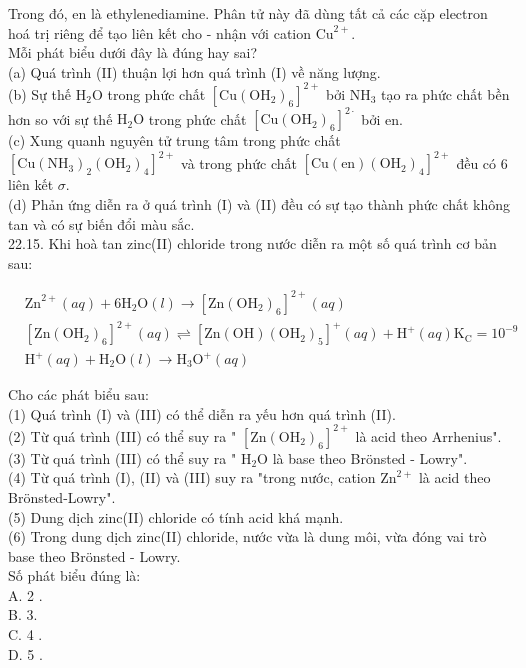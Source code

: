 \documentclass[10pt]{article}
\begin{document}
Trong đó, en là ethylenediamine. Phân tử này đã dùng tất cả các cặp electron hoá trị riêng để tạo liên kết cho - nhận với cation $\mathrm{Cu}^{2+}$.\\
Mỗi phát biểu dưới đây là đúng hay sai?\\
(a) Quá trình (II) thuận lợi hơn quá trình (I) về năng lượng.\\
(b) Sự thế $\mathrm{H}_{2} \mathrm{O}$ trong phức chất $\left[\mathrm{Cu}\left(\mathrm{OH}_{2}\right)_{6}\right]^{2+}$ bởi $\mathrm{NH}_{3}$ tạo ra phức chất bền hơn so với sự thế $\mathrm{H}_{2} \mathrm{O}$ trong phức chất $\left[\mathrm{Cu}\left(\mathrm{OH}_{2}\right)_{6}\right]^{2 \cdot}$ bởi en.\\
(c) Xung quanh nguyên tử trung tâm trong phức chất $\left[\mathrm{Cu}\left(\mathrm{NH}_{3}\right)_{2}\left(\mathrm{OH}_{2}\right)_{4}\right]^{2+}$ và trong phức chất $\left[\mathrm{Cu}(\mathrm{en})\left(\mathrm{OH}_{2}\right)_{4}\right]^{2+}$ đều có 6 liên kết $\sigma$.\\
(d) Phản ứng diễn ra ở quá trình (I) và (II) đều có sự tạo thành phức chất không tan và có sự biến đổi màu sắc.\\
22.15. Khi hoà tan zinc(II) chloride trong nước diễn ra một số quá trình cơ bản sau:


\begin{align*}
& \mathrm{Zn}^{2+}(a q)+6 \mathrm{H}_{2} \mathrm{O}(l) \rightarrow\left[\mathrm{Zn}\left(\mathrm{OH}_{2}\right)_{6}\right]^{2+}(a q)  \tag{I}\\
& {\left[\mathrm{Zn}\left(\mathrm{OH}_{2}\right)_{6}\right]^{2+}(a q) \rightleftharpoons\left[\mathrm{Zn}(\mathrm{OH})\left(\mathrm{OH}_{2}\right)_{5}\right]^{+}(a q)+\mathrm{H}^{+}(a q) \mathrm{K}_{\mathrm{C}}=10^{-9}}  \tag{II}\\
& \mathrm{H}^{+}(a q)+\mathrm{H}_{2} \mathrm{O}(l) \rightarrow \mathrm{H}_{3} \mathrm{O}^{+}(a q) \tag{III}
\end{align*}


Cho các phát biểu sau:\\
(1) Quá trình (I) và (III) có thể diễn ra yếu hơn quá trình (II).\\
(2) Từ quá trình (III) có thể suy ra " $\left[\mathrm{Zn}\left(\mathrm{OH}_{2}\right)_{6}\right]^{2+}$ là acid theo Arrhenius".\\
(3) Từ quá trình (III) có thể suy ra " $\mathrm{H}_{2} \mathrm{O}$ là base theo Brönsted - Lowry".\\
(4) Từ quá trình (I), (II) và (III) suy ra "trong nước, cation $\mathrm{Zn}^{2+}$ là acid theo Brönsted-Lowry".\\
(5) Dung dịch zinc(II) chloride có tính acid khá mạnh.\\
(6) Trong dung dịch zinc(II) chloride, nước vừa là dung môi, vừa đóng vai trò base theo Brönsted - Lowry.\\
Số phát biểu đúng là:\\
A. 2 .\\
B. 3.\\
C. 4 .\\
D. 5 .
\end{document}
